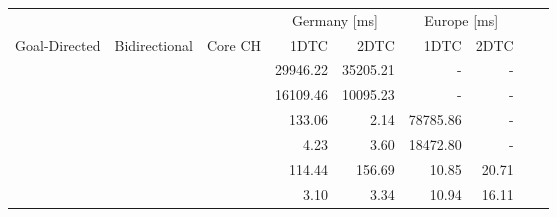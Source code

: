 \begin{tabular}{cccrrrrrr}
	\toprule
	              &               &         & \multicolumn{2}{c}{Germany [\si{\milli\second}]} & \multicolumn{2}{c}{Europe [\si{\milli\second}]}               \\
	Goal-Directed & Bidirectional & Core CH & 1DTC                                             & 2DTC                                            & 1DTC & 2DTC \\
	\midrule
	\xmark        & \xmark        & \xmark  & 29946.22                                                & 35205.21                                               & -    & -    \\
	\xmark        & \cmark        & \xmark  & 16109.46                                                & 10095.23                                               & -    & -    \\
	\cmark        & \xmark        & \xmark  & 133.06                                                & 2.14                                               & 78785.86    & -    \\
	\cmark        & \cmark        & \xmark  & 4.23                                                & 3.60                                               & 18472.80    & -    \\
	\xmark        & \cmark        & \cmark  & 114.44                                                & 156.69                                               & 10.85    & 20.71    \\
	\cmark        & \cmark        & \cmark  & 3.10                                                & 3.34                                               & 10.94    & 16.11    \\
	\bottomrule
\end{tabular}